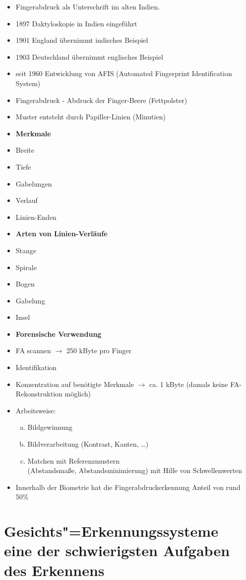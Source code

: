 \documentclass[a4paper,12pt]{scrreprt}
\newcommand{\itemd}[1]{\item{\textbf{#1}} }
\begin{document}
\begin{itemize}
 \item Fingerabdruck als Unterschrift im alten Indien.
 \item 1897 Daktyloskopie in Indien eingeführt
 \item 1901 England übernimmt indisches Beispiel
 \item 1903 Deutschland übernimmt englisches Beispiel
 \item seit 1960 Entwicklung von AFIS (Automated Fingerprint Identification System)
 \item Fingerabdruck - Abdruck der Finger-Beere (Fettpolster)
 \item Muster entsteht durch Papiller-Linien (Minutien)
 \itemd{Merkmale}
 \item Breite
 \item Tiefe
 \item Gabelungen
 \item Verlauf
 \item Linien-Enden
 \itemd{Arten von Linien-Verläufe}
 \item Stange
 \item Spirale
 \item Bogen
 \item Gabelung
 \item Insel
 \itemd{ Forensische Verwendung}
 \item FA scannen $\to$ 250 kByte pro Finger
 \item Identifikation
 \item Konzentration auf benötigte Merkmale $\to$ ca. 1 kByte (damals keine FA-Rekonstruktion möglich)
 \item Arbeitsweise:
 \begin{enumerate}[a)]
  \item Bildgewinnung
  \item Bildverarbeitung (Kontrast, Kanten, \dots )
  \item Matchen mit Referenzmustern\\
  (Abstandsmaße, Abstandsminimierung) mit Hilfe von Schwellenwerten
 \end{enumerate}
 \item Innerhalb der Biometrie hat die Fingerabdruckerkennung Anteil von rund 50\%
\end{itemize}


\section{Gesichts"=Erkennungssysteme\\ eine der schwierigsten Aufgaben des Erkennens}
\end{document}
